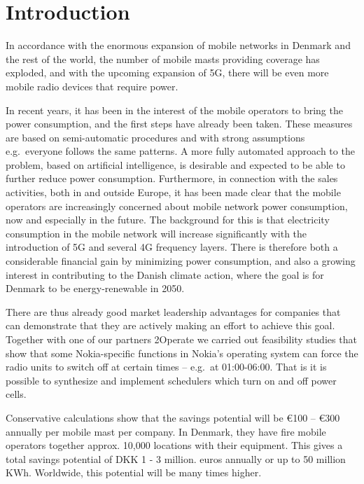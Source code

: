 \section{Introduction}

In accordance with the enormous expansion of mobile networks in
Denmark and the rest of the world, the number of mobile masts
providing coverage has exploded, and with the upcoming expansion of
5G, there will be even more mobile radio devices that require power.

In recent years, it has been in the interest of the mobile operators
to bring the power consumption, and the first steps have already been
taken.  These measures are based on semi-automatic procedures and with
strong assumptions e.g.\ everyone follows the same patterns.
%
A more fully automated approach to the problem, based on artificial
intelligence, is desirable and expected to be able to further reduce
power consumption.
%
Furthermore, in connection with the sales activities, both in and
outside Europe, it has been made clear that the mobile operators are
increasingly concerned about mobile network power consumption, now and
especially in the future.  The background for this is that electricity
consumption in the mobile network will increase significantly with the
introduction of 5G and several 4G frequency layers.  There is
therefore both a considerable financial gain by minimizing power
consumption, and also a growing interest in contributing to the Danish
climate action, where the goal is for Denmark to be energy-renewable
in 2050.
%

There are thus already good market leadership advantages for companies
that can demonstrate that they are actively making an effort to
achieve this goal.  Together with one of our partners 2Operate we
carried out feasibility studies that show that some Nokia-specific
functions in Nokia's operating system can force the radio units to
switch off at certain times -- e.g.\ at 01:00-06:00. That is it is
possible to synthesize and implement schedulers which turn on and off
power cells.

Conservative calculations show that the savings potential will be €100
– €300 annually per mobile mast per company. In Denmark, they have
fire mobile operators together approx. 10,000 locations with their
equipment.  This gives a total savings potential of DKK 1 - 3
million. euros annually or up to 50 million KWh. Worldwide, this
potential will be many times higher. 



